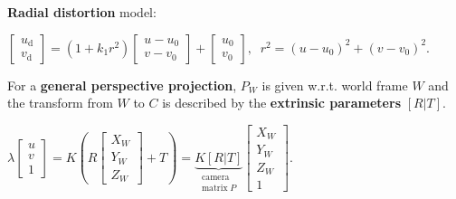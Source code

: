 \documentclass[landscape]{article}
\newcommand{\vmspace}{\vspace{-7pt}}
\newcommand{\vpspace}{\vspace{5pt}}
\begin{document}
\begin{multicols}{3}
\begin{minipage}{\columnwidth}
  \textbf{Radial distortion} model:
  \vmspace
  \begin{center}
    $
    \left[\begin{matrix}
      u_{\mathrm d} \\
      v_{\mathrm d}
    \end{matrix}\right]
    =
    (1 + k_1 r^2)
    \left[\begin{matrix}
      u - u_0 \\
      v - v_0
    \end{matrix}\right]
    +
    \left[\begin{matrix}
      u_0 \\
      v_0
    \end{matrix}\right],\;\;
    r^2 = (u - u_0)^2 + (v - v_0)^2.
    $
  \end{center}
\end{minipage}

\vpspace

\begin{minipage}{\columnwidth}
  For a \textbf{general perspective projection}, $P_W$ is given w.r.t. world
  frame $W$ and the transform from $W$ to $C$ is described by the
  \textbf{extrinsic parameters} $[R|T]$.
  \vmspace
  \begin{center}
    $
    \lambda
    \left[\begin{matrix}
      u \\
      v \\
      1
    \end{matrix}\right]
    =
    K\left(R
    \left[\begin{matrix}
      X_W \\
      Y_W \\
      Z_W
    \end{matrix}\right]
    + T\right)
    =
    \underbrace{
    K[R|T]
    }_{\substack{\text{camera} \\ \text{matrix}\;P}}
    \left[\begin{matrix}
      X_W \\
      Y_W \\
      Z_W \\
      1
    \end{matrix}\right].
    $
  \end{center}
\end{minipage}


\vpspace


\end{multicols}
\end{document}
